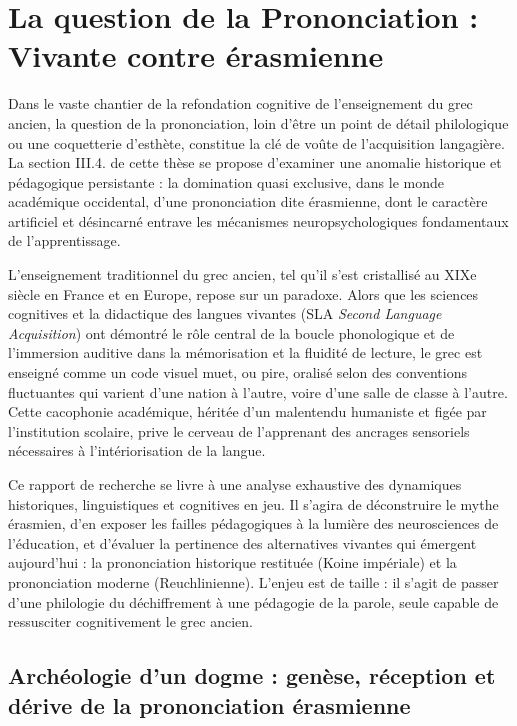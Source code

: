 

\section{La question de la Prononciation : Vivante contre érasmienne}

Dans le vaste chantier de la refondation cognitive de l'enseignement du grec ancien, la question de
la prononciation, loin d'être un point de détail philologique ou une coquetterie d'esthète,
constitue la clé de voûte de l'acquisition langagière. La section III.4.\cite{ref1} de cette thèse
se propose d'examiner une anomalie historique et pédagogique persistante : la domination quasi
exclusive, dans le monde académique occidental, d'une prononciation dite \og érasmienne\fg{}, dont
le caractère artificiel et désincarné entrave les mécanismes neuropsychologiques fondamentaux de
l'apprentissage.

L'enseignement traditionnel du grec ancien, tel qu'il s'est cristallisé au XIXe siècle en France et
en Europe, repose sur un paradoxe. Alors que les sciences cognitives et la didactique des langues
vivantes (SLA \- \textit{Second Language Acquisition}) ont démontré le rôle central de la boucle
phonologique et de l'immersion auditive dans la mémorisation et la fluidité de lecture, le grec est
enseigné comme un code visuel muet, ou pire, oralisé selon des conventions fluctuantes qui varient
d'une nation à l'autre, voire d'une salle de classe à l'autre. Cette \og cacophonie\fg{} académique,
héritée d'un malentendu humaniste et figée par l'institution scolaire, prive le cerveau de
l'apprenant des ancrages sensoriels nécessaires à l'intériorisation de la langue.

Ce rapport de recherche se livre à une analyse exhaustive des dynamiques historiques, linguistiques
et cognitives en jeu. Il s'agira de déconstruire le mythe érasmien, d'en exposer les failles
pédagogiques à la lumière des neurosciences de l'éducation, et d'évaluer la pertinence des
alternatives \og vivantes\fg{} qui émergent aujourd'hui : la prononciation historique restituée
(Koine impériale) et la prononciation moderne (Reuchlinienne). L'enjeu est de taille : il s'agit de
passer d'une philologie du déchiffrement à une pédagogie de la parole, seule capable de \og
ressusciter\fg{} cognitivement le grec ancien.



\subsection{Archéologie d'un dogme : genèse, réception et dérive de la prononciation érasmienne}

